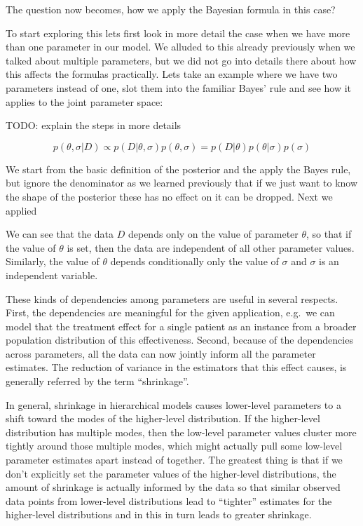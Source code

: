 \documentclass[12pt,a4paper,leqno]{report}
\theoremstyle{plain}
\theoremstyle{definition}
\theoremstyle{remark}
\begin{document}
The question now becomes, how we apply the Bayesian formula in this case?

To start exploring this lets first look in more detail the case when we have
more than one parameter in our model. We alluded to this already previously
when we talked about multiple parameters, but we did not go into details
there about how this affects the formulas practically. Lets take an example where
we have two parameters instead of one, slot them into the familiar Bayes’ rule
and see how it applies to the joint parameter space:

TODO: explain the steps in more details

\begin{def}\label{conjugatebayesrule}
    \begin{equation}
        p(\theta, \sigma|D) \propto p(D|\theta, \sigma) p(\theta, \sigma) = p(D|\theta) p(\theta|\sigma) p(\sigma)
    \end{equation}
\end{def}

We start from the basic definition of the posterior and the apply the Bayes rule, but ignore
the denominator as we learned previously that if we just want to know the shape of the
posterior these has no effect on it can be dropped. Next we applied

We can see that the data \(D\) depends only on the value of parameter \(\theta \), so that
if the value of \(\theta \) is set, then the data are independent of all other
parameter values. Similarly, the value of \(\theta \) depends conditionally only
the value of \(\sigma \) and \(\sigma \) is an independent variable.

These kinds of dependencies among parameters are useful in several respects.
First, the dependencies are meaningful for the given application, e.g.\ we can
model that the treatment effect for a single patient as an instance from a
broader population distribution of this effectiveness. Second, because of the
dependencies across parameters, all the data can now jointly inform all the
parameter estimates. The reduction of variance in the estimators that this
effect causes, is generally referred by the term ``shrinkage''.

In general, shrinkage in hierarchical models causes lower-level parameters to
a shift toward the modes of the higher-level distribution. If the higher-level
distribution has multiple modes, then the low-level parameter values cluster
more tightly around those multiple modes, which might actually pull some
low-level parameter estimates apart instead of together. The greatest thing
is that if we don't explicitly set the parameter values of the higher-level
distributions, the amount of shrinkage is actually informed by the data so that
similar observed data points from lower-level distributions lead to ``tighter''
estimates for the higher-level distributions and in this in turn leads to
greater shrinkage.
\end{document}
